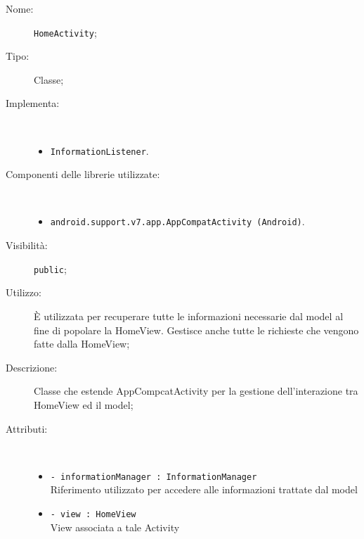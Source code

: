 \documentclass[../DefinizioneDiProdotto.tex]{subfiles}
\begin{document}
\begin{description}
	\item[Nome:] \texttt{HomeActivity};
	\item[Tipo:] Classe;
	\item[Implementa:] \
	\begin{itemize}
		\item \texttt{InformationListener}.
		
	\end{itemize}
	\item[Componenti delle librerie utilizzate:] \
	\begin{itemize}
		\item \texttt{android.support.v7.app.AppCompatActivity (Android)}.
		
	\end{itemize}
	\item[Visibilità:] \texttt{public};
	\item[Utilizzo:] È utilizzata per recuperare tutte le informazioni necessarie dal model al fine di popolare la HomeView. Gestisce anche tutte le richieste che vengono fatte dalla HomeView;
	\item[Descrizione:] Classe che estende AppCompcatActivity per la gestione dell'interazione tra HomeView ed il model;
	\item[Attributi:] \
	\begin{itemize}
		\item \texttt{- informationManager : InformationManager}\\
		Riferimento utilizzato per accedere alle informazioni trattate dal model
		
		\item \texttt{- view : HomeView}\\
		View associata a tale Activity
		

\end{itemize}
\end{description}
\end{document}
